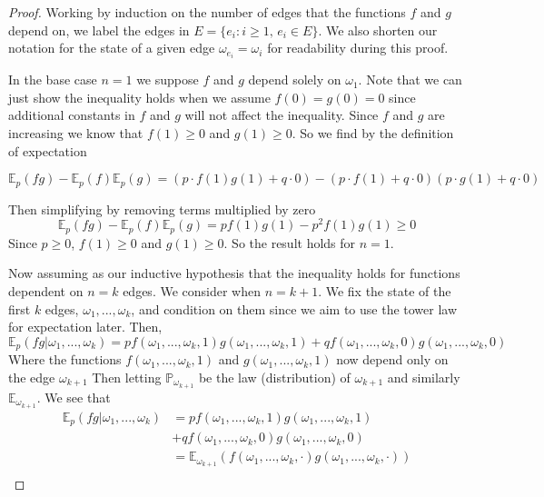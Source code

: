 \documentclass[a4paper,11pt]{article}
\theoremstyle{definition}
\newcommand{\expp}{\mathbb{E}_p}
\begin{document}
\begin{proof}
	Working by induction on the number of edges that the functions $f$ and $g$ depend on, we label the edges in $E = \{e_i : i \geq 1 \text{, } e_i \in E\}$.
	We also shorten our notation for the state of a given edge $\omega_{e_i} = \omega_i$ for readability during this proof.
	

	In the base case $n = 1$ we suppose $f$ and $g$ depend solely on $\omega_1$.
	Note that we can just show the inequality holds when we assume $f(0) = g(0) = 0$ since additional constants in $f$ and $g$ will not affect the inequality. 
	Since $f$ and $g$ are increasing we know that $f(1) \geq 0$ and $g(1) \geq 0$.
	So we find by the definition of expectation 

	$$\expp(fg) - \expp(f)\expp(g) = (p \cdot f(1)g(1) + q \cdot  0) - (p \cdot f(1) + q \cdot 0)(p \cdot g(1) + q \cdot 0) $$
	
	Then simplifying by removing terms multiplied by zero
	$$\expp(fg) - \expp(f)\expp(g) = pf(1)g(1) - p^2f(1)g(1) \geq 0$$
	Since $p\geq 0$, $f(1)\geq 0$ and $g(1) \geq 0$.
	So the result holds for $n=1$.


	Now assuming as our inductive hypothesis that the inequality holds for functions dependent on $n = k$ edges.
	We consider when $ n = k+1$.
	We fix the state of the first $k$ edges, $\omega_1, ..., \omega_k$, and condition on them since we aim to use the tower law for expectation later.
	Then,
	$$\expp(fg|\omega_1,...,\omega_k) = p f(\omega_1,...,\omega_k,1)g(\omega_1,...,\omega_k,1)
	+ qf(\omega_1,...,\omega_k,0)g(\omega_1,...,\omega_k,0)$$
	Where the functions $f(\omega_1,...,\omega_k,1)$ and $g(\omega_1,...,\omega_k,1)$ now depend only on the edge $\omega_{k+1}$
	Then letting $ \mathbb{P}_{\omega_{k+1}}$ be the law (distribution) of $\omega_{k+1}$ and similarly $\mathbb{E}_{\omega_{k+1}}$.
	We see that 
	\begin{align*}
		\expp(fg|\omega_1,...,\omega_k) &= p f(\omega_1,...,\omega_k,1)g(\omega_1,...,\omega_k,1)\\
	&+ qf(\omega_1,...,\omega_k,0)g(\omega_1,...,\omega_k,0)\\
	&= \mathbb{E}_{\omega_{k+1}}(f(\omega_1,...,\omega_k,\cdot)g(\omega_1,...,\omega_k,\cdot))\\
	\end{align*}


\end{proof}
\end{document}
